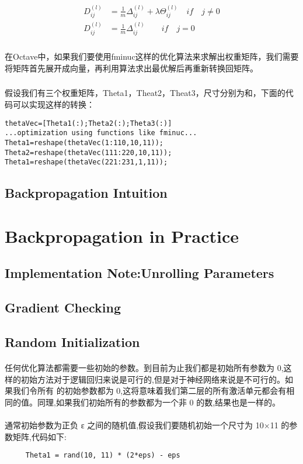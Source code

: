 \documentclass{article}
\begin{document}
\begin{CJK}{UTF8}{gbsn}
\begin{align}
D_{ij}^{(l)} & =\frac{1}{m}\Delta_{ij}^{(l)}+\lambda\Theta_{ij}^{(l)}\quad{if\quad{j\neq0}}\\
D_{ij}^{(l)} & =\frac{1}{m}\Delta_{ij}^{(l)}\qquad{if\quad{j=0}}
\end{align}
\subparagraph{}
在Octave中，如果我们要使用fminuc这样的优化算法来求解出权重矩阵，我们需要将矩阵首先展开成向量，再利用算法求出最优解后再重新转换回矩阵。
\subparagraph{}
假设我们有三个权重矩阵，Theta1，Theat2，Theat3，尺寸分别为和，下面的代码可以实现这样的转换：
\begin{verbatim}
thetaVec=[Theta1(:);Theta2(:);Theta3(:)]
...optimization using functions like fminuc...
Theta1=reshape(thetaVec(1:110,10,11));
Theta2=reshape(thetaVec(111:220,10,11));
Theta1=reshape(thetaVec(221:231,1,11));
\end{verbatim}
\subsection{Backpropagation Intuition}
\subparagraph{}
\section{Backpropagation in Practice}
\subsection{Implementation Note:Unrolling Parameters}
\subsection{Gradient Checking}
\subsection{Random Initialization}
\paragraph{ }
任何优化算法都需要一些初始的参数。到目前为止我们都是初始所有参数为 0,这样的初始方法对于逻辑回归来说是可行的,但是对于神经网络来说是不可行的。如果我们令所有
的初始参数都为 0,这将意味着我们第二层的所有激活单元都会有相同的值。同理,如果我们初始所有的参数都为一个非 0 的数,结果也是一样的。
\paragraph{}
通常初始参数为正负 ε 之间的随机值,假设我们要随机初始一个尺寸为 10×11 的参数矩阵,代码如下:
    \begin{verbatim}
     Theta1 = rand(10, 11) * (2*eps) - eps
    \end{verbatim}

\end{CJK}
\end{document}
